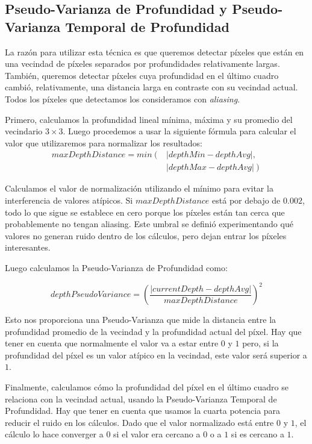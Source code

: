 \documentclass[pregrado]{tesis-usb} %
\begin{document}
\subsection{Pseudo-Varianza de Profundidad y Pseudo-Varianza Temporal de Profundidad}
La razón para utilizar esta técnica es que queremos detectar píxeles que están en una vecindad de píxeles separados por profundidades relativamente largas. También, queremos detectar píxeles cuya profundidad en el último cuadro cambió, relativamente, una distancia larga en contraste con su vecindad actual. Todos los píxeles que detectamos los consideramos con \textit{aliasing}.

Primero, calculamos la profundidad lineal mínima, máxima y su promedio del vecindario $3\times 3$. Luego procedemos a usar la siguiente fórmula para calcular el valor que utilizaremos para normalizar los resultados: 
\begin{equation} \label{eq:maxdepthdistance}
\begin{split} 
	maxDepthDistance = min \left( \right. & \left| depthMin-depthAvg \right|  ,   \\ 
	 &  \left.\left| depthMax-depthAvg\right| \right) 
\end{split} 
\end{equation}

Calculamos el valor de normalización utilizando el mínimo para evitar la interferencia de valores atípicos. Si $maxDepthDistance$ está por debajo de $0.002$, todo lo que sigue se establece en cero porque los píxeles están tan cerca que probablemente no tengan aliasing. Este umbral se definió experimentando qué valores no generan ruido dentro de los cálculos, pero dejan entrar los píxeles interesantes.

Luego calculamos la Pseudo-Varianza de Profundidad como:

\begin{equation} \label{eq:depthpseudovariance}
	depthPseudoVariance = \left( \frac{\left|currentDepth-depthAvg\right|}{maxDepthDistance}\right)^2
\end{equation}

Esto nos proporciona una Pseudo-Varianza que mide la distancia entre la profundidad promedio de la vecindad y la profundidad actual del píxel. Hay que tener en cuenta que normalmente el valor va a estar entre $0$ y $1$ pero, si la profundidad del píxel es un valor atípico en la vecindad, este valor será superior a $1$.

Finalmente, calculamos cómo la profundidad del píxel en el último cuadro se relaciona con la vecindad actual, usando la Pseudo-Varianza Temporal de Profundidad. Hay que tener en cuenta que usamos la cuarta potencia para reducir el ruido en los cálculos. Dado que el valor normalizado está entre $0$ y $1$, el cálculo lo hace converger a $0$ si el valor era cercano a $0$ o a $1$ si es cercano a $1$.
\end{document}
